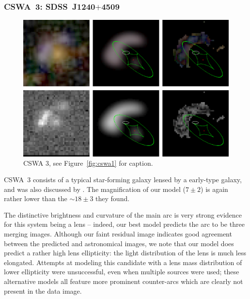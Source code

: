\documentclass[iop]{emulateapj}
\begin{document}
\subsubsection*{CSWA~3: SDSS\ J1240$+$4509}
\label{sec:results:indinotes:cswa3}


\begin{figure}[!ht]
	\centering\includegraphics[width=\linewidth]{figs/3.eps}
	\caption{CSWA 3, see Figure~\ref{fig:cswa1} for caption.}
	\label{fig:cswa3}
\end{figure}

CSWA~3 consists of a typical star-forming galaxy lensed by a early-type galaxy,
and was also discussed by \citet{Bel++09}. The magnification of our model ($7
\pm 2$) is again rather lower than  the $\sim 18 \pm 3$ they  found. 

The distinctive brightness and curvature of the main arc is very  strong
evidence for this system being a lens -- indeed, our best model predicts the arc
to be three merging images.  Although our faint residual image indicates good
agreement between the predicted and astronomical images, we note that our model
does predict  a rather  high lens ellipticity: the light distribution of the
lens is much less elongated.  Attempts at modeling this candidate with a lens
mass distribution  of lower ellipticity were unsuccessful, even when multiple
sources were used; these alternative models all feature more prominent
counter-arcs which are clearly not present in the data image.   


\end{document}
